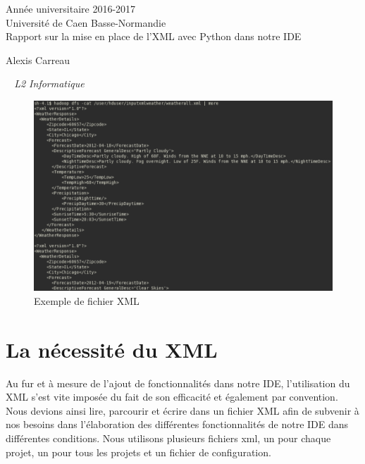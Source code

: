 \documentclass[a4paper,12pt]{article}
\begin{document}
\begin{titlepage}
	\begin{center}
		\Large{Année universitaire 2016-2017}\\
		\Large{Université de Caen Basse-Normandie}\\[1cm]
		
		\huge{Rapport sur la mise en place de l'XML avec Python dans notre IDE}\\
		\vspace{3cm}
		
		Alexis Carreau
		
	\normalsize{\textit{ ~ L2 Informatique}}\\
		\medskip
		\vspace{2cm}
		
	\begin{figure}[h!]
			\begin{center}
				\includegraphics[scale=0.7]{images/intro.png}
				\caption{Exemple de fichier XML}
			\end{center}
		\end{figure}
				
	\end{center}
\end{titlepage}

\tableofcontents
\newpage

\section{La nécessité du XML}

Au fur et à mesure de l'ajout de fonctionnalités dans notre IDE, l'utilisation du XML s'est vite imposée du fait de son efficacité et également par convention. Nous devions ainsi lire, parcourir et écrire dans un fichier XML afin de subvenir à nos besoins dans l'élaboration des différentes fonctionnalités de notre IDE dans différentes conditions. Nous utilisons plusieurs fichiers xml, un pour chaque projet, un pour tous les projets et un fichier de configuration.
	
\end{document}
